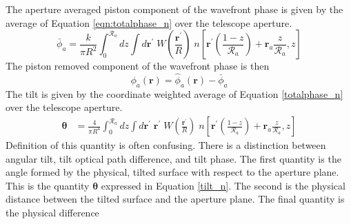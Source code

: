 

The aperture averaged piston component of the wavefront phase is given by the average of
Equation \ref{eqn:totalphase_n} over the telescope aperture.
\begin{equation}\label{eqn:pistonphase_n}
\bar{\phi}_{a} = \frac{k}{\pi R^{2}} \int_{0}^{\mathcal{R}_{a}} dz 
\int d\boldsymbol{r}^{\prime} \; 
W \left( \frac{\boldsymbol{r}^{\prime}}{R} \right) \;
n
\left[\boldsymbol{r}^{\prime} \left( \frac{1-z}{\mathcal{R}_{a}} \right) + 
\boldsymbol{r}_{a} \frac{z}{\mathcal{R}_{a}}, z \right]
\end{equation}
The piston removed component of the wavefront phase is then
\begin{equation}\label{prphase_n}
\phi_{a}\left(\boldsymbol{r}\right) = \hat{\phi}_{a}\left(\boldsymbol{r}\right) - \bar{\phi}_{a}
\end{equation}
The tilt is given by the coordinate weighted average of Equation
\ref{totalphase_n} over the telescope aperture.
\begin{equation}\label{tilt_n}
\begin{aligned}
\boldsymbol{\theta} &= \frac{4}{\pi R^{4}} \int_{0}^{\mathcal{R}_{a}} dz 
\int d\boldsymbol{r}^{\prime} \; \boldsymbol{r}^{\prime} \;
W \left( \frac{\boldsymbol{r}^{\prime}}{R} \right) \;
n
\left[ \boldsymbol{r}^{\prime} \left(\frac{1-z}{\mathcal{R}_{a}}\right) + 
\boldsymbol{r}_{a} \frac{z}{\mathcal{R}_{a}}, z\right]
\end{aligned}
\end{equation}
Definition of this quantity is often confusing.  There is a
distinction between angular tilt, tilt optical path difference, and
tilt phase.  The first quantity is the angle formed by the physical,
tilted surface with respect to the aperture plane.  This is the
quantity $\boldsymbol{\theta}$ expressed in Equation \ref{tilt_n}.
The second is the physical distance between the tilted surface and the
aperture plane.  The final quantity is the physical difference
